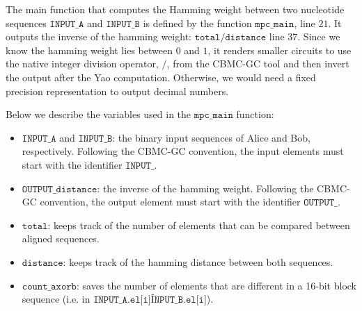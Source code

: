 The main function that computes the Hamming weight between two nucleotide sequences $\texttt{INPUT\_A}$ and $\texttt{INPUT\_B}$ is defined by the function $\texttt{mpc\_main}$, line $21$. It outputs the inverse of the hamming weight: $\texttt{total/distance}$ line $37$. Since we know the hamming weight lies between $0$ and $1$, it renders smaller circuits to use the native integer division operator, $/$, from the CBMC-GC tool and then invert the output after the Yao computation. Otherwise, we would need a fixed precision representation to output decimal numbers.

Below we describe the variables used in the $\texttt{mpc\_main}$ function:
\begin{itemize}
\item $\texttt{INPUT\_A}$ and $\texttt{INPUT\_B}$: the binary input sequences of Alice and Bob, respectively. Following the CBMC-GC convention, the input elements must start with the identifier $\texttt{INPUT\_}$.

\item $\texttt{OUTPUT\_distance}$: the inverse of the hamming weight. Following the CBMC-GC convention, the output element must start with the identifier $\texttt{OUTPUT\_}$.

\item $\texttt{total}$: keeps track of the number of elements that can be compared between aligned sequences.

\item $\texttt{distance}$: keeps track of the hamming distance between both sequences.

\item $\texttt{count\_axorb}$: saves the number of elements that are different in a 16-bit block sequence (i.e. in $\texttt{INPUT\_A.el[i]\^{}INPUT\_B.el[i]}$).
\end{itemize}


